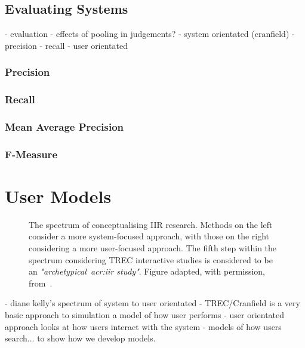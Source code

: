 \subsection{Evaluating Systems}\label{sec:ir_background:evaluation}
- evaluation
    - effects of pooling in judgements?
    - system orientated (cranfield)
        - precision
        - recall
    - user orientated

\subsubsection{Precision}

\subsubsection{Recall}

\subsubsection{Mean Average Precision}

\subsubsection{F-Measure}


\section{User Models}


\begin{figure}[t!]
    \centering
    \caption[The spectrum of conceptualising IIR research~\citep{kelly2009iir}]{The spectrum of conceptualising IIR research. Methods on the left consider a more system-focused approach, with those on the right considering a more user-focused approach. The fifth step within the spectrum considering TREC interactive studies is considered to be an \emph{"archetypical~\gls{acr:iir} study"}. Figure adapted, with permission, from~\cite{kelly2009iir}.}
    \label{fig:inverted}
\end{figure}

    - diane kelly's spectrum of system to user orientated
        - TREC/Cranfield is a very basic approach to simulation
            a model of how user performs
        - user orientated approach looks at how users interact with the system
        - models of how users search... to show how we develop models.
        
